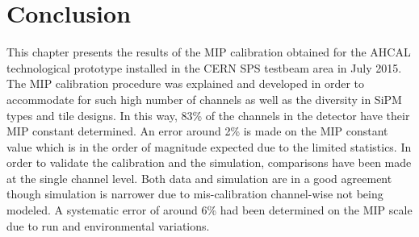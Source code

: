 \section{Conclusion}

This chapter presents the results of the MIP calibration obtained for the AHCAL technological prototype installed in the CERN SPS testbeam area in July 2015. The MIP calibration procedure was explained and developed in order to accommodate for such high number of channels as well as the diversity in SiPM types and tile designs. In this way, 83\% of the channels in the detector have their MIP constant determined. An error around 2\% is made on the MIP constant value which is in the order of magnitude expected due to the limited statistics. In order to validate the calibration and the simulation, comparisons have been made at the single channel level. Both data and simulation are in a good agreement though simulation is narrower due to mis-calibration channel-wise not being modeled. A systematic error of around 6\% had been determined on the MIP scale due to run and environmental variations.
